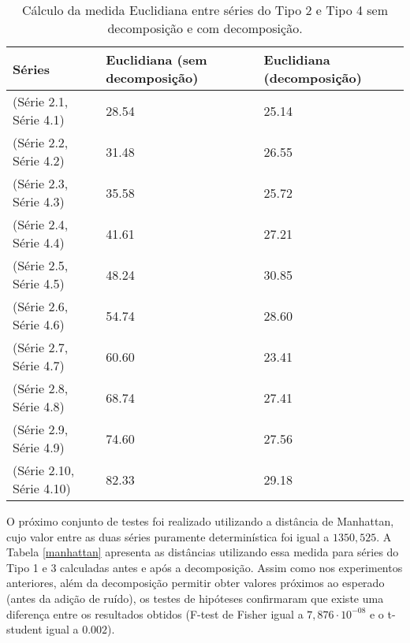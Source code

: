 \begin{table}[!ht]
\centering
\caption{Cálculo da medida Euclidiana entre séries do Tipo 2 e Tipo 4 sem decomposição e com decomposição.}
\begin{tabular}{lll}
 \hline
Séries & Euclidiana (sem decomposição) & Euclidiana (decomposição) \\
 \hline
 \hline
(Série 2.1, Série 4.1) & 28.54 & 25.14\\ 
(Série 2.2, Série 4.2) & 31.48 & 26.55\\ 
(Série 2.3, Série 4.3) & 35.58 & 25.72\\
(Série 2.4, Série 4.4) & 41.61 & 27.21\\ 
(Série 2.5, Série 4.5) & 48.24 & 30.85\\
(Série 2.6, Série 4.6) & 54.74 & 28.60\\
(Série 2.7, Série 4.7) & 60.60 & 23.41\\ 
(Série 2.8, Série 4.8) & 68.74 & 27.41\\ 
(Série 2.9, Série 4.9) & 74.60 & 27.56\\
(Série 2.10, Série 4.10) & 82.33 & 29.18\\ 
  \hline
\end{tabular}
\label{euclidiana2}
\end{table}


O próximo conjunto de testes foi realizado utilizando a distância de Manhattan, cujo valor entre as duas séries puramente determinística foi igual a $1350,525$. A Tabela \ref{manhattan} apresenta as distâncias utilizando essa medida para séries do Tipo 1 e 3 calculadas antes e após a decomposição. Assim como nos experimentos anteriores, além da decomposição permitir obter valores próximos ao esperado (antes da adição de ruído), os testes de hipóteses confirmaram que existe uma diferença entre os resultados obtidos (F-test de Fisher igual a $7,876 \cdot 10^{-08}$  e o t-student igual a $0.002$).


